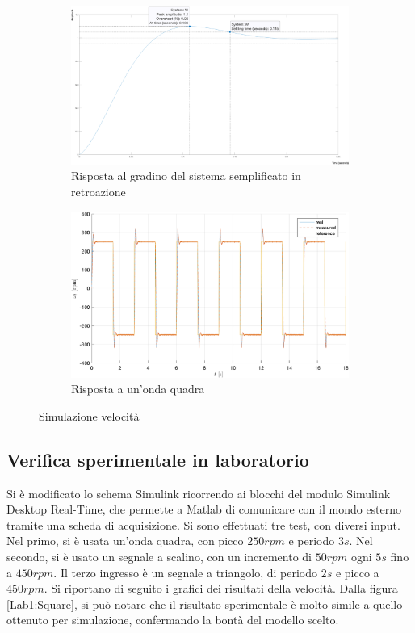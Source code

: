 \documentclass[a4paper, 11pt]{article}
\begin{document}
\begin{figure}[H]
    \centering
    \begin{subfigure}{0.4\linewidth}
        \centering
        \includegraphics[width=\linewidth]{./Images/Gesu3.png}
        \caption{Risposta al gradino del sistema semplificato in retroazione}
        \label{Lab6:Step}
    \end{subfigure}
    \hfill
    \begin{subfigure}{0.4\linewidth}
        \centering
        \includegraphics[width=\linewidth]{./Images/Gesu4.png}
        \caption{Risposta a un'onda quadra}
        \label{Lab6:Square}
    \end{subfigure}
    \caption{Simulazione velocità}
\end{figure}

\subsection{Verifica sperimentale in laboratorio}
Si è modificato lo schema Simulink ricorrendo ai blocchi del modulo Simulink Desktop Real-Time, che permette a Matlab di comunicare con il mondo esterno tramite una scheda di acquisizione. Si sono effettuati tre test, con diversi input. Nel primo, si è usata un'onda quadra, con picco $250rpm$ e periodo $3s$. Nel secondo, si è usato un segnale a scalino, con un incremento di $50 rpm$ ogni $5s$ fino a $450rpm$. Il terzo ingresso è un segnale a triangolo, di periodo $2s$ e picco a $450rpm$. Si riportano di seguito i grafici dei risultati della velocità. Dalla figura \ref{Lab1:Square}, si può notare che il risultato sperimentale è molto simile a quello ottenuto per simulazione, confermando la bontà del modello scelto.
\end{document}
